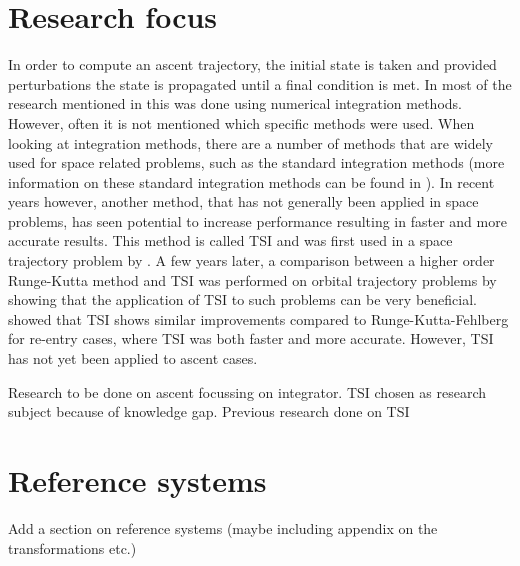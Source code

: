 \section{Research focus}
\label{sec:researchFocus}
In order to compute an ascent trajectory, the initial state is taken and provided perturbations the state is propagated until a final condition is met. In most of the research mentioned in  this was done using numerical integration methods. However, often it is not mentioned which specific methods were used. When looking at integration methods, there are a number of methods that are widely used for space related problems, such as the standard integration methods (more information on these standard integration methods can be found in ). In recent years however, another method, that has not generally been applied in space problems, has seen potential to increase performance resulting in faster and more accurate results. This method is called \ac{TSI} and was first used in a space trajectory problem by \cite{montenbruck1992numerical}. A few years later, a comparison between a higher order Runge-Kutta method and \ac{TSI} was performed on orbital trajectory problems by \cite{scott2008high} showing that the application of \ac{TSI} to such problems can be very beneficial. \cite{bergsma2016application} showed that \ac{TSI} shows similar improvements compared to Runge-Kutta-Fehlberg for re-entry cases, where \ac{TSI} was both faster and more accurate. However, \ac{TSI} has not yet been applied to ascent cases.

 

Research to be done on ascent focussing on integrator.
TSI chosen as research subject because of knowledge gap.
Previous research done on TSI

\section{Reference systems}
\label{sec:referenceSystems}
Add a section on reference systems (maybe including appendix on the transformations etc.)
